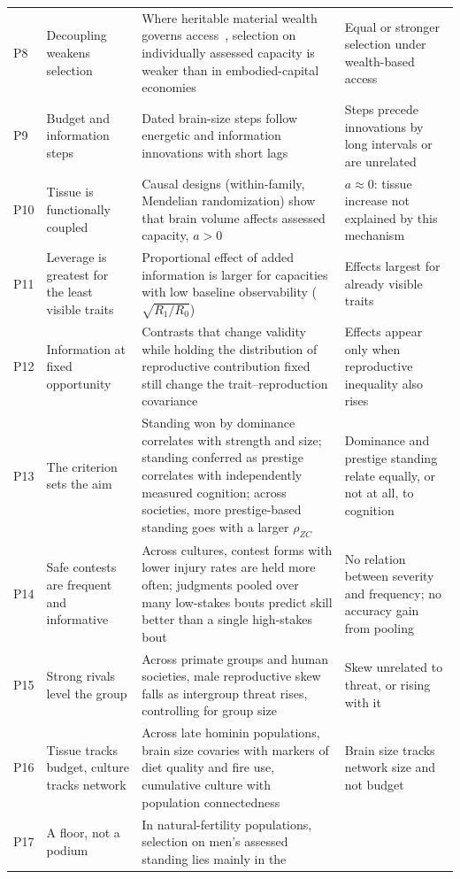 \begin{table}[tp]
\begin{tabularx}{\textwidth}{@{}P{0.028\textwidth}P{0.19\textwidth}LP{0.25\textwidth}@{}}
P8 & Decoupling weakens selection & Where heritable material wealth governs access~\cite{borgerhoffmulder2009}, selection on
individually assessed capacity is weaker than in embodied-capital economies & Equal or stronger selection under wealth-based
access\\
P9 & Budget and information steps & Dated brain-size steps follow energetic and information innovations with short lags &
Steps precede innovations by long intervals or are unrelated\\
P10 & Tissue is functionally coupled & Causal designs (within-family, Mendelian randomization) show that brain volume
affects assessed capacity, $a>0$ & $a\approx0$: tissue increase not explained by this mechanism\\
P11 & Leverage is greatest for the least visible traits & Proportional effect of added information is larger for capacities
with low baseline observability ($\sqrt{R_1/R_0}$) & Effects largest for already visible traits\\
P12 & Information at fixed opportunity & Contrasts that change validity while holding the distribution of reproductive
contribution fixed still change the trait--reproduction covariance & Effects appear only when reproductive inequality also
rises\\
P13 & The criterion sets the aim & Standing won by dominance correlates with strength and size; standing conferred as
prestige correlates with independently measured cognition; across societies, more prestige-based standing goes with a larger
$\rho_{ZC}$ & Dominance and prestige standing relate equally, or not at all, to cognition\\
P14 & Safe contests are frequent and informative & Across cultures, contest forms with lower injury rates are held more
often; judgments pooled over many low-stakes bouts predict skill better than a single high-stakes bout & No relation between
severity and frequency; no accuracy gain from pooling\\
P15 & Strong rivals level the group & Across primate groups and human societies, male reproductive skew falls as intergroup
threat rises, controlling for group size & Skew unrelated to threat, or rising with it\\
P16 & Tissue tracks budget, culture tracks network & Across late hominin populations, brain size covaries with markers of
diet quality and fire use, cumulative culture with population connectedness & Brain size tracks network size and not
budget\\
P17 & A floor, not a podium & In natural-fertility populations, selection on men's assessed standing lies mainly in the

\end{tabularx}
\end{table}
